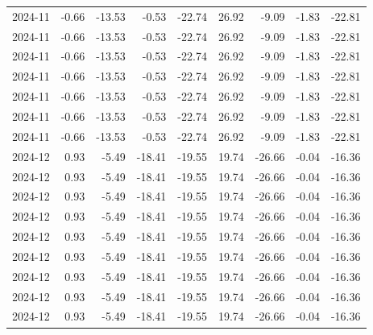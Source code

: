 \begin{table}[ht]
\begin{tabular}{lrrrrrrrr}
  2024-11 & -0.66 & -13.53 & -0.53 & -22.74 & 26.92 & -9.09 & -1.83 & -22.81 \\ 
  2024-11 & -0.66 & -13.53 & -0.53 & -22.74 & 26.92 & -9.09 & -1.83 & -22.81 \\ 
  2024-11 & -0.66 & -13.53 & -0.53 & -22.74 & 26.92 & -9.09 & -1.83 & -22.81 \\ 
  2024-11 & -0.66 & -13.53 & -0.53 & -22.74 & 26.92 & -9.09 & -1.83 & -22.81 \\ 
  2024-11 & -0.66 & -13.53 & -0.53 & -22.74 & 26.92 & -9.09 & -1.83 & -22.81 \\ 
  2024-11 & -0.66 & -13.53 & -0.53 & -22.74 & 26.92 & -9.09 & -1.83 & -22.81 \\ 
  2024-11 & -0.66 & -13.53 & -0.53 & -22.74 & 26.92 & -9.09 & -1.83 & -22.81 \\ 
  2024-12 & 0.93 & -5.49 & -18.41 & -19.55 & 19.74 & -26.66 & -0.04 & -16.36 \\ 
  2024-12 & 0.93 & -5.49 & -18.41 & -19.55 & 19.74 & -26.66 & -0.04 & -16.36 \\ 
  2024-12 & 0.93 & -5.49 & -18.41 & -19.55 & 19.74 & -26.66 & -0.04 & -16.36 \\ 
  2024-12 & 0.93 & -5.49 & -18.41 & -19.55 & 19.74 & -26.66 & -0.04 & -16.36 \\ 
  2024-12 & 0.93 & -5.49 & -18.41 & -19.55 & 19.74 & -26.66 & -0.04 & -16.36 \\ 
  2024-12 & 0.93 & -5.49 & -18.41 & -19.55 & 19.74 & -26.66 & -0.04 & -16.36 \\ 
  2024-12 & 0.93 & -5.49 & -18.41 & -19.55 & 19.74 & -26.66 & -0.04 & -16.36 \\ 
  2024-12 & 0.93 & -5.49 & -18.41 & -19.55 & 19.74 & -26.66 & -0.04 & -16.36 \\ 
  2024-12 & 0.93 & -5.49 & -18.41 & -19.55 & 19.74 & -26.66 & -0.04 & -16.36 \\ 
   \hline
\end{tabular}
\end{table}
